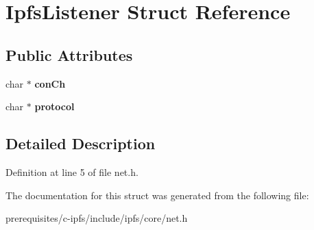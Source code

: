 \hypertarget{struct_ipfs_listener}{}\section{Ipfs\+Listener Struct Reference}
\label{struct_ipfs_listener}
\subsection*{Public Attributes}
\begin{DoxyCompactItemize}
\item 
\mbox{\label{struct_ipfs_listener_a9cb1b9837570aab1cd8f35ae9d216fc4}} 
char $\ast$ {\bfseries con\+Ch}
\item 
\mbox{\label{struct_ipfs_listener_aebfc36ffee6eda45e51808a95797ac60}} 
char $\ast$ {\bfseries protocol}
\end{DoxyCompactItemize}


\subsection{Detailed Description}


Definition at line 5 of file net.\+h.



The documentation for this struct was generated from the following file\+:\begin{DoxyCompactItemize}
\item 
prerequisites/c-\/ipfs/include/ipfs/core/net.\+h\end{DoxyCompactItemize}
